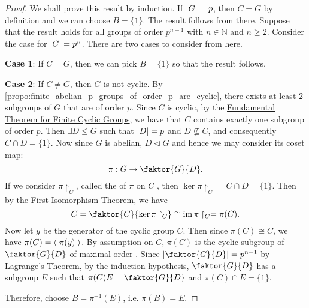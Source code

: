 \begin{proof}
  We shall prove this result by induction. If $\left|G\right| = p$, then $C = G$ by definition and we can choose $B = \{1\}$. The result follows from there. Suppose that the result holds for all groups of order $p^{n - 1}$ with $n \in \mathbb{N}$ and $n \geq 2$. Consider the case for $\left|G\right| = p^n$. There are two cases to consider from here.

  \noindent \textbf{Case 1}: If $C = G$, then we can pick $B = \{1\}$ so that the result follows.

  \noindent \textbf{Case 2}: If $C \neq G$, then $G$ is not cyclic. By \cref{propo:finite_abelian_p_groups_of_order_p_are_cyclic}, there exists at least 2 subgroups of $G$ that are of order $p$. Since $C$ is cyclic, by the \hyperref[thm:fundamental_theorem_of_finite_cyclic_groups]{Fundamental Theorem for Finite Cyclic Groups}, we have that $C$ contains exactly one subgroup of order $p$. Then $\exists D \leq G$ such that $\left|D\right| = p$ and $D \not\subseteq C$, and consequently $C \cap D = \{1\}$. Now since $G$ is abelian, $D \triangleleft G$ and hence we may consider its coset map:
  \begin{equation*}
    \pi : G \to \faktor{G}{D}.
  \end{equation*}
  If we consider $\pi \restriction_C$, called the  of $\pi$ on $C$ , then $\ker \pi \restriction_C = C \cap D = \{1\}$. Then by the \hyperref[thm:first_isomorphism_theorem]{First Isomorphism Theorem}, we have
  \begin{equation*}
    C = \faktor{C}{\ker \pi \restriction_C} \cong \img \pi \restriction_C = \pi(C).
  \end{equation*}
  Now let $y$ be the generator of the cyclic group $C$. Then since $\pi(C) \cong C$, we have $\pi(C) = \langle \;  \pi(y)  \; \rangle$. By assumption on $C$, $\pi(C)$ is the cyclic subgroup of $\faktor{G}{D}$ of maximal order . Since $\abs{ \faktor{G}{D} } = p^{n - 1}$ by\\
  \noindent \hyperref[thm:lagrange_s_theorem]{Lagrange's Theorem}, by the induction hypothesis, $\faktor{G}{D}$ has a subgroup $E$ such that $\pi(C) E = \faktor{G}{D}$ and $\pi(C) \cap E = \{1\}$.

  Therefore, choose $B = \pi^{-1} (E)$, i.e. $\pi(B) = E$.


\end{proof}
